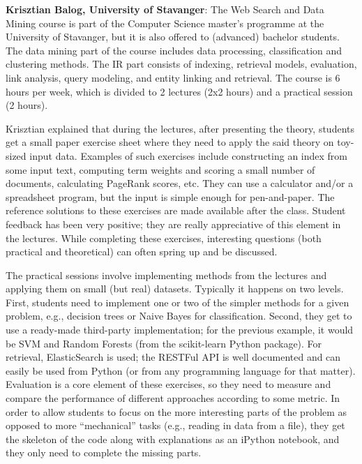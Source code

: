 {\bf Krisztian Balog, University of Stavanger}:
The Web Search and Data Mining course is part of the Computer Science master's programme at the University of Stavanger, but it is also offered to (advanced) bachelor students.
The data mining part of the course includes data processing, classification and clustering methods.  The IR part consists of indexing, retrieval models, evaluation, link analysis, query modeling, and entity linking and retrieval.
The course is 6 hours per week, which is divided to 2 lectures (2x2 hours) and a practical session (2 hours).  

Krisztian explained that during the lectures, after presenting the theory, students get a small paper exercise sheet where they need to apply the said theory on toy-sized input data.  Examples of such exercises include constructing an index from some input text, computing term weights and scoring a small number of documents, calculating PageRank scores, etc.  They can use a calculator and/or a spreadsheet program, but the input is simple enough for pen-and-paper. The reference solutions to these exercises are made available after the class.  Student feedback has been very positive; they are really appreciative of this element in the lectures. While completing these exercises, interesting questions (both practical and theoretical) can often spring up and be discussed.
 
The practical sessions involve implementing methods from the lectures and applying them on small (but real) datasets.  Typically it happens on two levels.  First, students need to implement one or two of the simpler methods for a given problem, e.g., decision trees or Naive Bayes for classification. Second, they get to use a ready-made third-party implementation; for the previous example, it would be SVM and Random Forests (from the scikit-learn Python package). For retrieval, ElasticSearch is used; the RESTFul API is well documented and can easily be used from Python (or from any programming language for that matter).  Evaluation is a core element of these exercises, so they need to measure and compare the performance of different approaches according to some metric. 
In order to allow students to focus on the more interesting parts of the problem as opposed to more ``mechanical'' tasks (e.g., reading in data from a file), they get the skeleton of the code along with explanations as an iPython notebook, and they only need to complete the missing parts.

